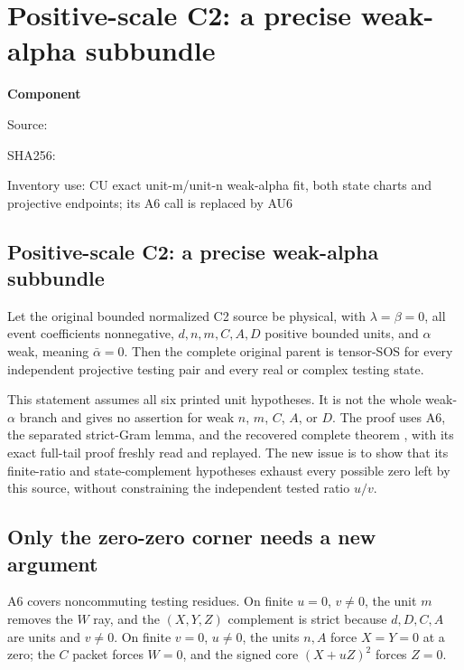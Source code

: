 \chapter{Positive-scale C2: a precise weak-alpha subbundle}
\label{component:pf31e38136e03}
\noindent\textbf{Component }\par
{\small\noindent Source: \par}
{\small\noindent SHA256: \par}
{\small\noindent Inventory use: CU exact unit-m/unit-n weak-alpha fit, both state charts and projective endpoints; its A6 call is replaced by AU6\par}
\medskip
\section{Positive-scale C2: a precise weak-alpha subbundle}


\begin{theorem}
Let the original bounded normalized C2 source be physical, with
$\lambda=\beta=0$, all event coefficients nonnegative,
$d,n,m,C,A,D$ positive bounded units, and $\alpha$ weak, meaning
$\bar\alpha=0$. Then the complete original parent is tensor-SOS
for every independent projective testing pair and every real or
complex testing state.
\end{theorem}

This statement assumes all six printed unit hypotheses. It is not
the whole weak-$\alpha$ branch and gives no assertion for weak $n$,
$m$, $C$, $A$, or $D$. The proof uses A6, the separated strict-Gram
lemma, and the recovered complete theorem
, with its exact
full-tail proof freshly read and replayed. The new issue is to show
that its finite-ratio and state-complement hypotheses exhaust every
possible zero left by this source, without constraining the independent
tested ratio $u/v$.

\section{Only the zero-zero corner needs a new argument}

A6 covers noncommuting testing residues. On finite $u=0$, $v\ne0$,
the unit $m$ removes the $W$ ray, and the $(X,Y,Z)$ complement is
strict because $d,D,C,A$ are units and $v\ne0$. On finite $v=0$,
$u\ne0$, the units $n,A$ force $X=Y=0$ at a zero; the $C$ packet
forces $W=0$, and the signed core $(X+uZ)^2$ forces $Z=0$.

